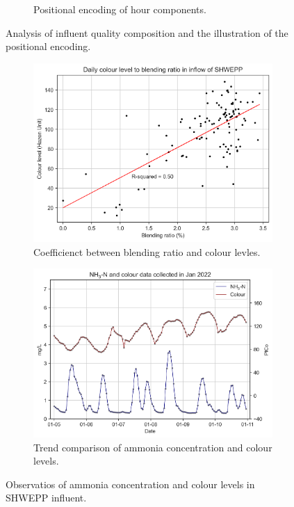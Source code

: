 \begin{figure}[h]
\begin{subfigure}[t]{0.45\textwidth}
      \caption{Positional encoding of hour components.} \label{fig:pos-encoding}
    \end{subfigure}%
  \caption{Analysis of influent quality composition and the illustration of the positional encoding.} \label{fig:blend-pos}
\end{figure}


\begin{figure}[h]
    \centering
    \begin{subfigure}[t]{0.45\textwidth}
        \includegraphics[width=\linewidth]{imgs/leachate-effluent-blend-ratio-color-plot/colour-blend-coef.png}
        \caption{Coefficienct between blending ratio and colour levles.} \label{fig:blend-colour-coef}
      \end{subfigure}%
    \hspace{2em}%
    \begin{subfigure}[t]{0.45\textwidth}
        \includegraphics[width=\linewidth]{imgs/results/colour-pattern.png}
        \caption{Trend comparison of ammonia concentration and colour levels.} \label{fig:color-to-nh3-pattern}
      \end{subfigure}%
  \caption{Observatios of ammonia concentration and colour levels in SHWEPP influent.} \label{fig:observation-shweep-influent}
\end{figure}

